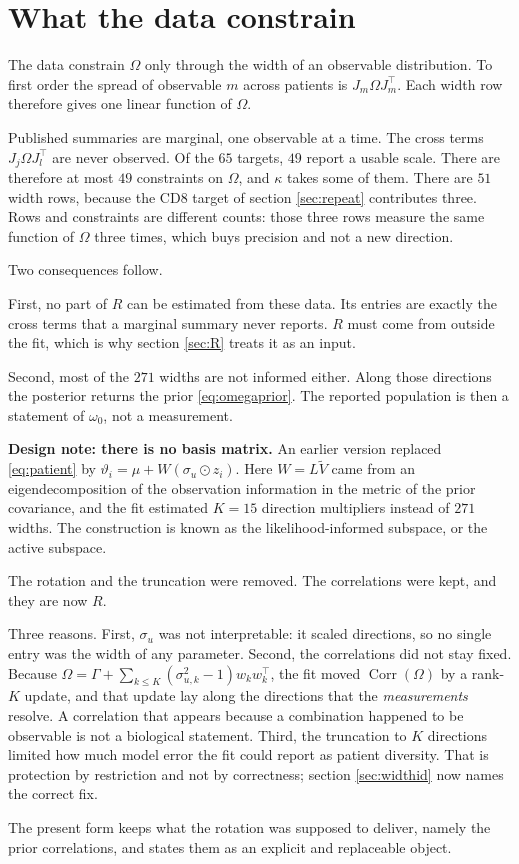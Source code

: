 \documentclass[11pt]{article}
\newcommand{\Tr}{^{\!\top}}
\DeclareMathOperator{\Corr}{Corr}
\begin{document}
\section{What the data constrain}
\label{sec:whatdataconstrain}

The data constrain $\Omega$ only through the width of an observable
distribution. To first order the spread of observable $m$ across patients is
$J_m\Omega J_m\Tr$. Each width row therefore gives one linear function of
$\Omega$.

Published summaries are marginal, one observable at a time. The cross terms
$J_j\Omega J_l\Tr$ are never observed. Of the $65$ targets, $49$ report a usable
scale. There are therefore at most $49$ constraints on $\Omega$, and $\kappa$
takes some of them. There are $51$ width rows, because the CD8 target of section
\ref{sec:repeat} contributes three. Rows and constraints are different counts:
those three rows measure the same function of $\Omega$ three times, which buys
precision and not a new direction.

Two consequences follow.

First, no part of $R$ can be estimated from these data. Its entries are exactly
the cross terms that a marginal summary never reports. $R$ must come from
outside the fit, which is why section \ref{sec:R} treats it as an input.

Second, most of the $271$ widths are not informed either. Along those
directions the posterior returns the prior \eqref{eq:omegaprior}. The reported
population is then a statement of $\omega_0$, not a measurement.

\begin{notebox}
\textbf{Design note: there is no basis matrix.} An earlier version replaced
\eqref{eq:patient} by $\vartheta_i=\mu+W(\sigma_u\odot z_i)$. Here $W=L\widetilde
V$ came from an eigendecomposition of the observation information in the metric
of the prior covariance, and the fit estimated $K=15$ direction multipliers
instead of $271$ widths. The construction is known as the likelihood-informed
subspace, or the active subspace.

The rotation and the truncation were removed. The correlations were kept, and
they are now $R$.

Three reasons. First, $\sigma_u$ was not interpretable: it scaled directions, so
no single entry was the width of any parameter. Second, the correlations did not
stay fixed. Because $\Omega=\Gamma+\sum_{k\le K}(\sigma_{u,k}^2-1)w_kw_k\Tr$, the
fit moved $\Corr(\Omega)$ by a rank-$K$ update, and that update lay along the
directions that the \emph{measurements} resolve. A correlation that appears
because a combination happened to be observable is not a biological statement.
Third, the truncation to $K$ directions limited how much model error the fit
could report as patient diversity. That is protection by restriction and not by
correctness; section \ref{sec:widthid} now names the correct fix.

The present form keeps what the rotation was supposed to deliver, namely the
prior correlations, and states them as an explicit and replaceable object.
\end{notebox}
\end{document}
